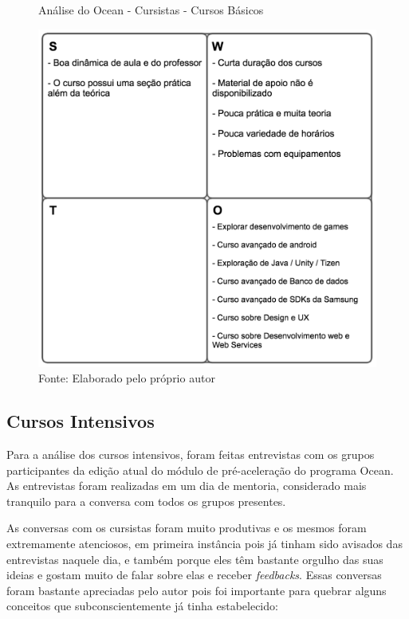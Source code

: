 \begin{figure}[h]
\caption{Análise do Ocean - Cursistas - Cursos Básicos}
\centerline{\includegraphics[scale=0.75]{img/cursosbasicosswot}}
\label{fig:swotcursosbasicos}
\caption* {Fonte: Elaborado pelo próprio autor}
\end{figure}

\subsection{Cursos Intensivos}

Para a análise dos cursos intensivos, foram feitas entrevistas com os grupos participantes da edição atual do módulo de pré-aceleração do programa Ocean. As entrevistas foram realizadas em um dia de mentoria, considerado mais tranquilo para a conversa com todos os grupos presentes.

As conversas com os cursistas foram muito produtivas e os mesmos foram extremamente atenciosos, em primeira instância pois já tinham sido avisados das entrevistas naquele dia, e também porque eles têm bastante orgulho das suas ideias e gostam muito de falar sobre elas e receber \textit{feedbacks}. Essas conversas foram bastante apreciadas pelo autor pois foi importante para quebrar alguns conceitos que subconscientemente já tinha estabelecido:

